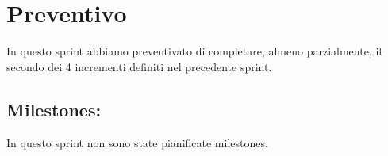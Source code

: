 \section{Preventivo}

In questo sprint abbiamo preventivato di completare, almeno parzialmente, il secondo dei 4 incrementi definiti nel precedente sprint.

\subsection{Milestones:}  

In questo sprint non sono state pianificate milestones.